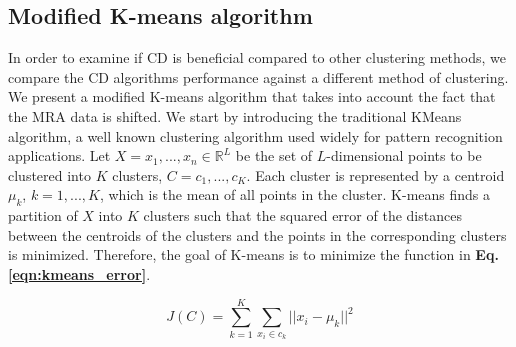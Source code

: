 \subsection{Modified K-means algorithm}
In order to examine if \acrshort{CD} is beneficial compared to other clustering methods, we compare the \acrshort{CD} algorithms performance against a different method of clustering. We present a modified K-means algorithm that takes into account the fact that the \acrshort{MRA} data is shifted.
We start by introducing the traditional KMeans algorithm\cite{10.5555/46712}, a well known clustering algorithm used widely for pattern recognition applications.
Let $X=x_1,...,x_n \in \mathbb{R}^L$ be the set of $L$-dimensional points to be clustered into $K$ clusters, $C=c_1,...,c_K$. Each cluster is represented by a centroid $\mu_k$, $k=1,...,K$, which is the mean of all points in the cluster. K-means finds a partition of $X$ into $K$ clusters such that the squared error of the distances between the centroids of the clusters and the points in the corresponding clusters is minimized. Therefore, the goal of K-means is to minimize the function in \textbf{Eq. \ref{eqn:kmeans_error}}.

\begin{equation}
\label{eqn:kmeans_error}
J(C)=\sum_{k=1}^K{\sum_{x_i \in c_k}{||x_i-\mu_k||^2}}
\end{equation} 

